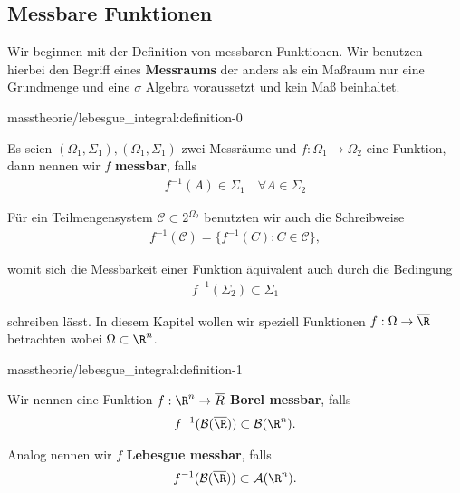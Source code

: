 \documentclass[letterpaper,10pt,german]{jupyterBook}
\begin{document}
\subsection{Messbare Funktionen}
\label{\detokenize{masstheorie/lebesgue_integral:messbare-funktionen}}
\par
Wir beginnen mit der Definition von messbaren Funktionen. Wir benutzen hierbei den Begriff eines \textbf{Messraums} der anders als ein Maßraum nur eine Grundmenge und eine \(\sigma\) Algebra voraussetzt und kein Maß beinhaltet.
\begin{definition}{}{masstheorie/lebesgue_integral:definition-0}



\par
Es seien \((\Omega_1,\Sigma_1), (\Omega_1,\Sigma_1)\) zwei Messräume und \(f:\Omega_1\to\Omega_2\) eine Funktion, dann nennen wir \(f\) \textbf{messbar}, falls
\begin{align*}
f^{-1}(A)\in\Sigma_1\quad\forall A\in\Sigma_2
\end{align*}\end{definition}

\par
Für ein Teilmengensystem \(\mathcal{C}\subset 2^{\Omega_2}\) benutzten wir auch die Schreibweise
\begin{align*}
f^{-1}(\mathcal{C}) = \{ f^{-1}(C): C\in\mathcal{C}\},
\end{align*}
\par
womit sich die Messbarkeit einer Funktion äquivalent auch durch die Bedingung
\begin{align*}
f^{-1}(\Sigma_2)\subset\Sigma_1
\end{align*}
\par
schreiben lässt. In diesem Kapitel wollen wir speziell Funktionen \(f:\Omega\to\overline{\R}\) betrachten wobei \(\Omega\subset\R^n\).
\begin{definition}{}{masstheorie/lebesgue_integral:definition-1}



\par
Wir nennen eine Funktion \(f:\R^n\to\overline{R}\) \textbf{Borel messbar}, falls
\begin{align*}
f^{-1}(\mathcal{B}(\overline{\R}))\subset \mathcal{B}(\R^n).
\end{align*}
\par
Analog nennen wir \(f\) \textbf{Lebesgue messbar}, falls
\begin{align*}
f^{-1}(\mathcal{B}(\overline{\R}))\subset \mathcal{A}(\R^n).
\end{align*}\end{definition}
\end{document}
